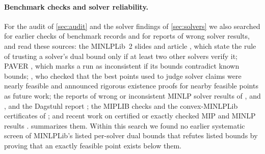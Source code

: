 \paragraph{Benchmark checks and solver reliability.}
For the audit of \cref{sec:audit} and the solver findings of \cref{sec:solvers} we also searched for earlier checks of benchmark records and for reports of wrong solver results, and read these sources:
the MINLPLib~2 slides and article \citep{vigerske2014-towards-minlplib-2-0,vigerske2014-minlplib-2}, which state the rule of trusting a solver's dual bound only if at least two other solvers verify it;
PAVER \citep{bussieck2014-paver-2-0-an-open}, which marks a run as inconsistent if its bounds contradict known bounds;
\citet{neumaier2005-a-comparison-of-complete-global}, who checked that the best points used to judge solver claims were nearly feasible and announced rigorous existence proofs for nearby feasible points as future work;
the reports of wrong or inconsistent MINLP solver results of \citet{nowak2008-lago-a-heuristic-branch-and}, \citet{montanher2018-a-computational-study-of-global} and \citet{bestuzheva2025-global-optimization-of-mixed-integer}, and the Dagstuhl report \citep{bonami2018-designing-and-implementing-algorithms-for};
the MIPLIB checks \citep{koch2011-miplib-2010-mixed-integer-programming,gleixner2021-miplib-2017-data-driven-compilation} and the convex-MINLPLib certificates of \citet{halbig2024-computing-optimality-certificates-for-convex};
and recent work on certified or exactly checked MIP and MINLP results \citep{borst2024-certified-constraint-propagation-and-dual,szeider2026-vipr-certificate-construction-from-black,hoen2025-analyzing-the-numerical-correctness-of,belotti2025-solving-minlps-to-global-optimality,merx2026-from-computational-certification-to-exact,araya2025-hybridizing-two-linear-relaxation-techniques}.
 summarizes them.
Within this search we found no earlier systematic screen of MINLPLib's listed per-solver dual bounds that refutes listed bounds by proving that an exactly feasible point exists below them.

